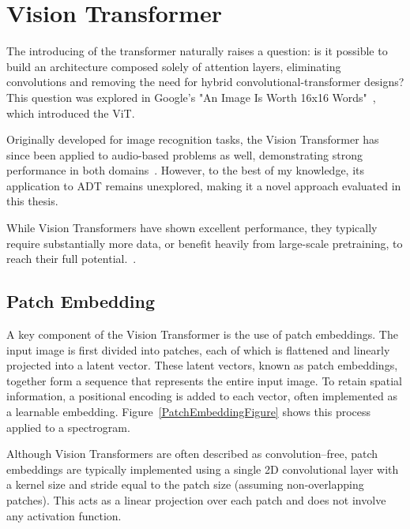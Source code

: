 \section{Vision Transformer}

The introducing of the transformer naturally raises a question: is it possible to build an architecture composed solely of attention layers, eliminating convolutions and removing the need for hybrid convolutional-transformer designs? This question was explored in Google's "An Image Is Worth 16x16 Words"~\cite{dosovitskiy2021imageworth16x16words}, which introduced the \gls{ViT}.

Originally developed for image recognition tasks, the Vision Transformer has since been applied to audio-based problems as well, demonstrating strong performance in both domains~\cite{dosovitskiy2021imageworth16x16words, gong2021astaudiospectrogramtransformer}. However, to the best of my knowledge, its application to \gls{ADT} remains unexplored, making it a novel approach evaluated in this thesis.

While Vision Transformers have shown excellent performance, they typically require substantially more data, or benefit heavily from large-scale pretraining, to reach their full potential.~\cite{dosovitskiy2021imageworth16x16words}.

\subsection{Patch Embedding}

A key component of the Vision Transformer is the use of patch embeddings. The input image is first divided into patches, each of which is flattened and linearly projected into a latent vector. These latent vectors, known as patch embeddings, together form a sequence that represents the entire input image. To retain spatial information, a positional encoding is added to each vector, often implemented as a learnable embedding. Figure~\ref{PatchEmbeddingFigure} shows this process applied to a spectrogram.

Although Vision Transformers are often described as convolution–free, patch embeddings are typically implemented using a single 2D convolutional layer with a kernel size and stride equal to the patch size (assuming non-overlapping patches). This acts as a linear projection over each patch and does not involve any activation function.

